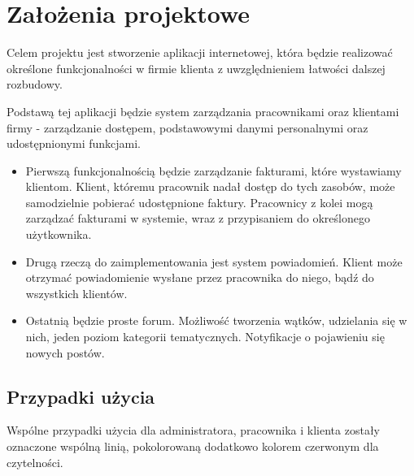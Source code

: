 \documentclass[12pt]{article}
\begin{document}
\newpage


\section{Założenia projektowe}

Celem projektu jest stworzenie aplikacji internetowej, która będzie realizować określone funkcjonalności w firmie klienta z uwzględnieniem łatwości dalszej rozbudowy.

Podstawą tej aplikacji będzie system zarządzania pracownikami oraz klientami firmy - zarządzanie dostępem, podstawowymi danymi personalnymi oraz udostępnionymi funkcjami.

\begin{itemize}
	\item
Pierwszą funkcjonalnością będzie zarządzanie fakturami, które wystawiamy klientom. Klient, któremu pracownik nadał dostęp do tych zasobów, może samodzielnie pobierać udostępnione faktury. Pracownicy z kolei mogą zarządzać fakturami w systemie, wraz z przypisaniem do określonego użytkownika.
\item
Drugą rzeczą do zaimplementowania jest system powiadomień. Klient może otrzymać powiadomienie wysłane przez pracownika do niego, bądź do wszystkich klientów.
\item 
Ostatnią będzie proste forum. Możliwość tworzenia wątków, udzielania się w nich, jeden poziom kategorii tematycznych. Notyfikacje o pojawieniu się nowych postów.
\end{itemize}

\subsection{Przypadki użycia}

Wspólne przypadki użycia dla administratora, pracownika i klienta zostały oznaczone wspólną linią, pokolorowaną dodatkowo kolorem czerwonym dla czytelności.
\end{document}
